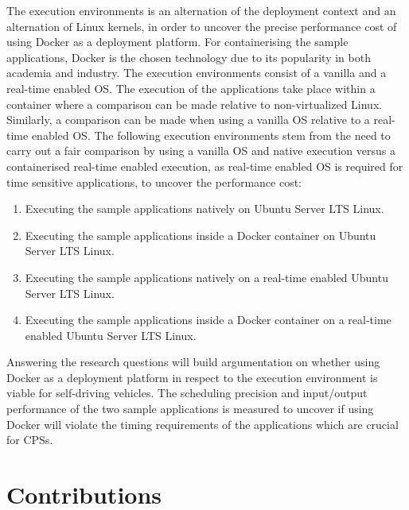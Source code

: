 The execution environments is an alternation of the deployment context and an alternation of Linux kernels, in order to uncover the precise performance cost of using Docker as a deployment platform. For containerising the sample applications, Docker is the chosen technology due to its popularity in both academia and industry. The execution environments consist of a vanilla and a real-time enabled OS. The execution of the applications take place within a container where a comparison can be made relative to non-virtualized Linux. Similarly, a comparison can be made when using a vanilla OS relative to a real-time enabled OS. The following execution environments stem from the need to carry out a fair comparison by using a vanilla OS and native execution versus a containerised real-time enabled execution, as real-time enabled OS is required for time sensitive applications, to uncover the performance cost:\\

\begin{enumerate}
\item Executing the sample applications natively on Ubuntu Server LTS Linux.
\item Executing the sample applications inside a Docker container on Ubuntu Server LTS Linux.
\item Executing the sample applications natively on a real-time enabled Ubuntu Server LTS Linux.
\item Executing the sample applications inside a Docker container on a real-time enabled Ubuntu Server LTS Linux.\\
\end{enumerate}

Answering the research questions will build argumentation on whether using Docker as a deployment platform in respect to the execution environment is viable for self-driving vehicles. The scheduling precision and input/output performance of the two sample applications is measured to uncover if using Docker will violate the timing requirements of the applications which are crucial for CPSs.



\section{Contributions}

